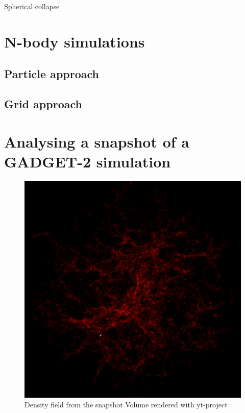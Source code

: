 \documentclass[12pt,twocolumn]{article}
\begin{document}
Spherical collapse


\section{N-body simulations}

\subsection{Particle approach}

\subsection{Grid approach}


\section{Analysing a snapshot of a GADGET-2 simulation}
\cite{aseem_shadab}

\begin{figure}[H]
	\centering
	\includegraphics[width=0.9\linewidth]{../density_assign/UniformGridData_Render_density}
	\caption{Density field from the snapshot \quad
		 Volume rendered with yt-project}
	\label{fig:uniformgriddatarenderdensity}
\end{figure}
\end{document}
